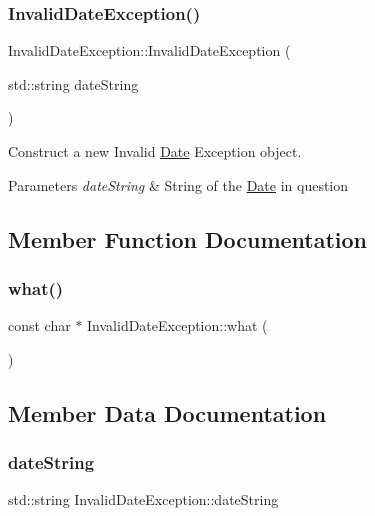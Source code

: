 \subsubsection{\texorpdfstring{Invalid\+Date\+Exception()}{InvalidDateException()}}
{\footnotesize\ttfamily Invalid\+Date\+Exception\+::\+Invalid\+Date\+Exception (\begin{DoxyParamCaption}\item[{std\+::string}]{date\+String }\end{DoxyParamCaption})}



Construct a new Invalid \mbox{\hyperlink{classDate}{Date}} Exception object. 


\begin{DoxyParams}{Parameters}
{\em date\+String} & String of the \mbox{\hyperlink{classDate}{Date}} in question \\
\hline
\end{DoxyParams}


\subsection{Member Function Documentation}
\mbox{\label{classInvalidDateException_af56c21dd2acc97de665ab5cb62daf6ad}} 
\subsubsection{\texorpdfstring{what()}{what()}}
{\footnotesize\ttfamily const char $\ast$ Invalid\+Date\+Exception\+::what (\begin{DoxyParamCaption}{ }\end{DoxyParamCaption})}



\subsection{Member Data Documentation}
\mbox{\label{classInvalidDateException_a70664a8f1fe8853eed11199c5c0f0060}} 
\subsubsection{\texorpdfstring{date\+String}{dateString}}
{\footnotesize\ttfamily std\+::string Invalid\+Date\+Exception\+::date\+String}



